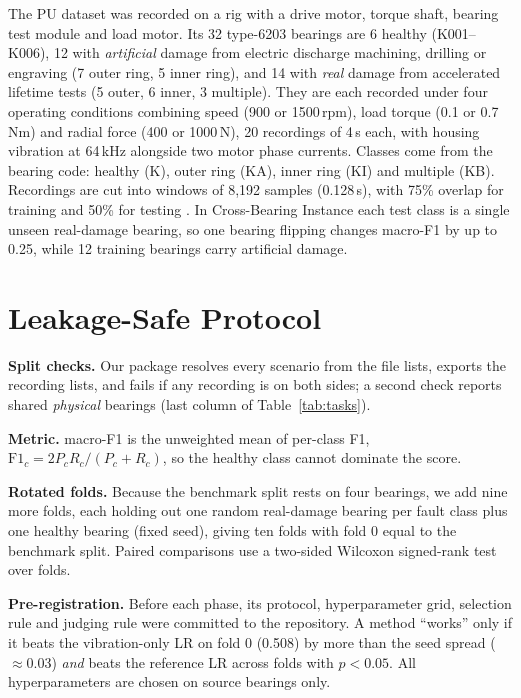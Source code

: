 \documentclass[conference]{IEEEtran}
\newcommand{\mF}{macro-F1}
\begin{document}
The PU dataset \cite{lessmeier2016} was recorded on a rig with a drive motor, torque shaft,
bearing test module and load motor. Its 32 type-6203 bearings are 6 healthy (K001--K006), 12 with \emph{artificial} damage
from electric discharge machining, drilling or engraving (7 outer ring, 5 inner ring), and 14
with \emph{real} damage from accelerated lifetime tests (5 outer, 6 inner, 3 multiple). They are each recorded under
four operating conditions combining speed (900 or 1500\,rpm), load torque (0.1 or 0.7\,Nm) and
radial force (400 or 1000\,N), 20 recordings of 4\,s each, with housing vibration at 64\,kHz
alongside two motor phase currents. Classes come from the bearing code: healthy (K), outer ring
(KA), inner ring (KI) and multiple (KB). Recordings are cut into windows of 8,192 samples
(0.128\,s), with 75\% overlap for training and 50\% for testing \cite{knap2026}. In Cross-Bearing
Instance each test class is a single unseen real-damage bearing, so one bearing flipping changes
\mF{} by up to 0.25, while 12 training bearings carry artificial damage.

\section{Leakage-Safe Protocol}\label{sec:protocol}
\textbf{Split checks.} Our package resolves every scenario from the file lists, exports the
recording lists, and fails if any recording is on both sides; a second check reports shared
\emph{physical} bearings (last column of Table~\ref{tab:tasks}).

\textbf{Metric.} \mF{} is the unweighted mean of per-class F1,
$\mathrm{F1}_c = 2P_cR_c/(P_c+R_c)$, so the healthy class cannot dominate the score.

\textbf{Rotated folds.} Because the benchmark split rests on four bearings, we add nine more
folds, each holding out one random real-damage bearing per fault class plus one healthy bearing
(fixed seed), giving ten folds with fold 0 equal to the benchmark split. Paired comparisons use
a two-sided Wilcoxon signed-rank test over folds.

\textbf{Pre-registration.} Before each phase, its protocol, hyperparameter grid, selection rule
and judging rule were committed to the repository. A method ``works'' only if it beats the
vibration-only LR on fold 0 (0.508) by more than the seed spread ($\approx$0.03) \emph{and} beats
the reference LR across folds with $p<0.05$. All hyperparameters are chosen on source bearings only.
\end{document}
